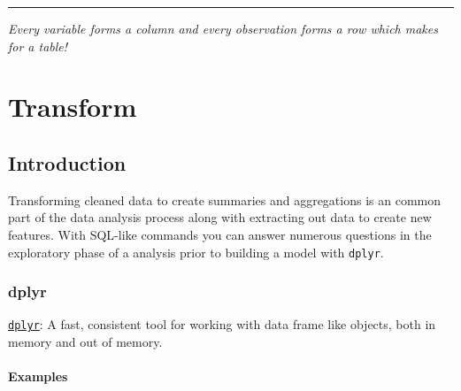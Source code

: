 \documentclass[]{book}
\newenvironment{Shaded}{\begin{snugshade}}{\end{snugshade}}
\newcommand{\KeywordTok}[1]{\textcolor[rgb]{0.13,0.29,0.53}{\textbf{{#1}}}}
\newcommand{\DataTypeTok}[1]{\textcolor[rgb]{0.13,0.29,0.53}{{#1}}}
\newcommand{\StringTok}[1]{\textcolor[rgb]{0.31,0.60,0.02}{{#1}}}
\newcommand{\CommentTok}[1]{\textcolor[rgb]{0.56,0.35,0.01}{\textit{{#1}}}}
\newcommand{\NormalTok}[1]{{#1}}
\begin{document}
\begin{center}\rule{0.5\linewidth}{\linethickness}\end{center}

\emph{Every variable forms a column and every observation forms a row
which makes for a table!}

\chapter{Transform}\label{transform}

\section{\texorpdfstring{\textbf{Introduction
}}{Introduction }}\label{introduction-3}

Transforming cleaned data to create summaries and aggregations is an
common part of the data analysis process along with extracting out data
to create new features. With SQL-like commands you can answer numerous
questions in the exploratory phase of a analysis prior to building a
model with \texttt{dplyr}.

\subsection{\texorpdfstring{\textbf{dplyr }}{dplyr }}\label{dplyr}

\href{https://cran.r-project.org/web/packages/dplyr/index.html}{\texttt{dplyr}}:
A fast, consistent tool for working with data frame like objects, both
in memory and out of memory.

\subsubsection{\texorpdfstring{\textbf{Examples
}}{Examples }}\label{examples-12}

\begin{Shaded}
\end{Shaded}
\end{document}
